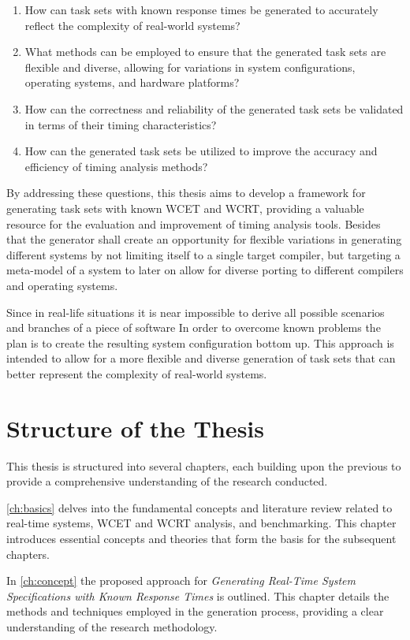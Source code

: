 \begin{enumerate}
	\item How can task sets with known response times be generated to accurately reflect the complexity of real-world systems?
	\item What methods can be employed to ensure that the generated task sets are flexible and diverse, allowing for variations in system configurations, operating systems, and hardware platforms?
	\item How can the correctness and reliability of the generated task sets be validated in terms of their timing characteristics?
	\item How can the generated task sets be utilized to improve the accuracy and efficiency of timing analysis methods?
\end{enumerate}

By addressing these questions, this thesis aims to develop a framework for generating task sets with known \ac{WCET} and \ac{WCRT}, providing a valuable resource for the evaluation and improvement of timing analysis tools.
Besides that the generator shall create an opportunity for flexible variations in generating different systems by not limiting itself to a single target compiler, but targeting a meta-model of a system to later on allow for diverse porting to different compilers and operating systems.

Since in real-life situations it is near impossible to derive all possible scenarios and branches of a piece of software 
In order to overcome known problems the plan is to create the resulting system configuration bottom up.
This approach is intended to allow for a more flexible and diverse generation of task sets that can better represent the complexity of real-world systems.


\section{Structure of the Thesis}\label{sec:structure}
This thesis is structured into several chapters, each building upon the previous to provide a comprehensive understanding of the research conducted.

\cref{ch:basics} delves into the fundamental concepts and literature review related to real-time systems, \ac{WCET} and \ac{WCRT} analysis, and benchmarking. 
This chapter introduces essential concepts and theories that form the basis for the subsequent chapters.

In \cref{ch:concept} the proposed approach for \textit{Generating Real-Time System Specifications with Known Response Times} is outlined. 
This chapter details the methods and techniques employed in the generation process, providing a clear understanding of the research methodology.

